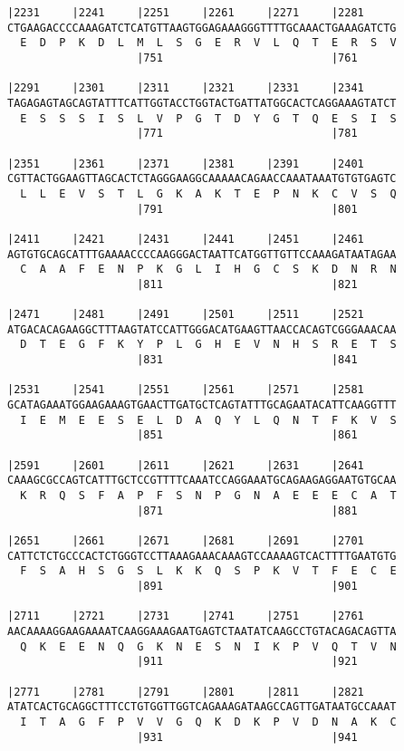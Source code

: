\documentclass{article}
\begin{document}
\begin{Verbatim}
|2231     |2241     |2251     |2261     |2271     |2281     
CTGAAGACCCCAAAGATCTCATGTTAAGTGGAGAAAGGGTTTTGCAAACTGAAAGATCTG
  E  D  P  K  D  L  M  L  S  G  E  R  V  L  Q  T  E  R  S  V
                    |751                          |761      
  
|2291     |2301     |2311     |2321     |2331     |2341     
TAGAGAGTAGCAGTATTTCATTGGTACCTGGTACTGATTATGGCACTCAGGAAAGTATCT
  E  S  S  S  I  S  L  V  P  G  T  D  Y  G  T  Q  E  S  I  S
                    |771                          |781      
  
|2351     |2361     |2371     |2381     |2391     |2401     
CGTTACTGGAAGTTAGCACTCTAGGGAAGGCAAAAACAGAACCAAATAAATGTGTGAGTC
  L  L  E  V  S  T  L  G  K  A  K  T  E  P  N  K  C  V  S  Q
                    |791                          |801      
  
|2411     |2421     |2431     |2441     |2451     |2461     
AGTGTGCAGCATTTGAAAACCCCAAGGGACTAATTCATGGTTGTTCCAAAGATAATAGAA
  C  A  A  F  E  N  P  K  G  L  I  H  G  C  S  K  D  N  R  N
                    |811                          |821      
  
|2471     |2481     |2491     |2501     |2511     |2521     
ATGACACAGAAGGCTTTAAGTATCCATTGGGACATGAAGTTAACCACAGTCGGGAAACAA
  D  T  E  G  F  K  Y  P  L  G  H  E  V  N  H  S  R  E  T  S
                    |831                          |841      
  
|2531     |2541     |2551     |2561     |2571     |2581     
GCATAGAAATGGAAGAAAGTGAACTTGATGCTCAGTATTTGCAGAATACATTCAAGGTTT
  I  E  M  E  E  S  E  L  D  A  Q  Y  L  Q  N  T  F  K  V  S
                    |851                          |861      
  
|2591     |2601     |2611     |2621     |2631     |2641     
CAAAGCGCCAGTCATTTGCTCCGTTTTCAAATCCAGGAAATGCAGAAGAGGAATGTGCAA
  K  R  Q  S  F  A  P  F  S  N  P  G  N  A  E  E  E  C  A  T
                    |871                          |881      
  
|2651     |2661     |2671     |2681     |2691     |2701     
CATTCTCTGCCCACTCTGGGTCCTTAAAGAAACAAAGTCCAAAAGTCACTTTTGAATGTG
  F  S  A  H  S  G  S  L  K  K  Q  S  P  K  V  T  F  E  C  E
                    |891                          |901      
  
|2711     |2721     |2731     |2741     |2751     |2761     
AACAAAAGGAAGAAAATCAAGGAAAGAATGAGTCTAATATCAAGCCTGTACAGACAGTTA
  Q  K  E  E  N  Q  G  K  N  E  S  N  I  K  P  V  Q  T  V  N
                    |911                          |921      
  
|2771     |2781     |2791     |2801     |2811     |2821     
ATATCACTGCAGGCTTTCCTGTGGTTGGTCAGAAAGATAAGCCAGTTGATAATGCCAAAT
  I  T  A  G  F  P  V  V  G  Q  K  D  K  P  V  D  N  A  K  C
                    |931                          |941      
  

\end{Verbatim}
\end{document}
